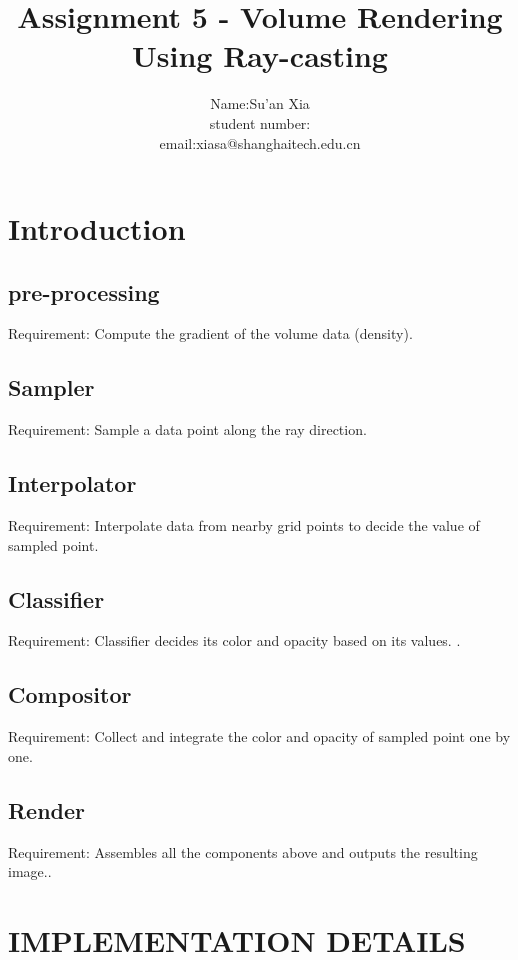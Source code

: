 \documentclass[acmtog]{acmart}
\title{Assignment 5 - Volume Rendering Using Ray-casting}
\author{Name:\quad Su'an Xia  \\ student number:\quad 18047482
	\\email:\quad xiasa@shanghaitech.edu.cn}
\begin{document}
\maketitle

\vspace*{2 ex}


\section{Introduction}
\subsection{pre-processing}
Requirement: Compute the gradient of the volume data (density).

\vspace*{1 ex}
\subsection{Sampler}
Requirement: Sample a data point along the ray direction.

\vspace*{1 ex}
\subsection{Interpolator}
Requirement: Interpolate data from nearby grid points to decide the value of sampled point.

\subsection{Classifier}
Requirement: Classifier decides its color and opacity based on its values. .

\subsection{Compositor}
Requirement: Collect and integrate the color and opacity of sampled point one by one.

\subsection{Render}
Requirement: Assembles all the components above and outputs the resulting image..

\vspace*{2 ex}
\section{IMPLEMENTATION DETAILS}
\end{document}
